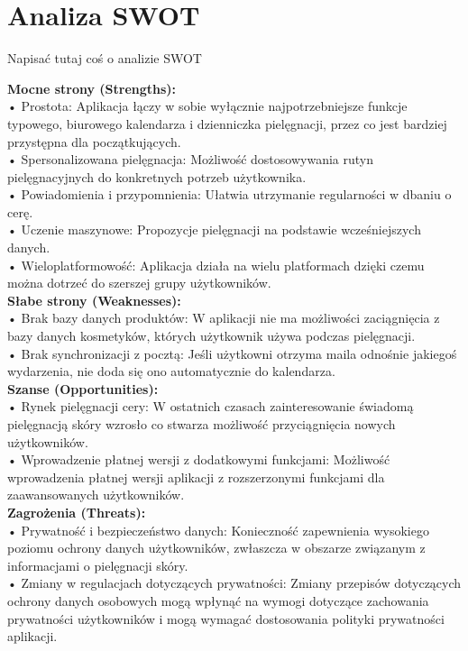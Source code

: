 \section{Analiza SWOT}
Napisać tutaj coś o analizie SWOT

\phantom{Th} 

\textbf{Mocne strony (Strengths):}\\
•	Prostota: Aplikacja łączy w sobie wyłącznie najpotrzebniejsze funkcje typowego, biurowego kalendarza i dzienniczka pielęgnacji, przez co jest bardziej przystępna dla początkujących.\\
•	Spersonalizowana pielęgnacja: Możliwość dostosowywania rutyn pielęgnacyjnych do konkretnych potrzeb użytkownika.\\
•	Powiadomienia i przypomnienia: Ułatwia utrzymanie regularności w dbaniu o cerę.\\
•	Uczenie maszynowe: Propozycje pielęgnacji na podstawie wcześniejszych danych.\\
•	Wieloplatformowość: Aplikacja działa na wielu platformach dzięki czemu można dotrzeć do szerszej grupy użytkowników.\\

\textbf{Słabe strony (Weaknesses):}\\
•	Brak bazy danych produktów: W aplikacji nie ma możliwości zaciągnięcia z bazy danych kosmetyków, których użytkownik używa podczas pielęgnacji.\\
•	Brak synchronizacji z pocztą: Jeśli użytkowni otrzyma maila odnośnie jakiegoś wydarzenia, nie doda się ono automatycznie do kalendarza.\\

\textbf{Szanse (Opportunities):}\\
•	Rynek pielęgnacji cery: W ostatnich czasach zainteresowanie świadomą pielęgnacją skóry wzrosło co stwarza możliwość przyciągnięcia nowych użytkowników.\\
•	Wprowadzenie płatnej wersji z dodatkowymi funkcjami: Możliwość wprowadzenia płatnej wersji aplikacji z rozszerzonymi funkcjami dla zaawansowanych użytkowników.\\

\textbf{Zagrożenia (Threats):}\\
•	Prywatność i bezpieczeństwo danych: Konieczność zapewnienia wysokiego poziomu ochrony danych użytkowników, zwłaszcza w obszarze związanym z informacjami o pielęgnacji skóry.\\
•	Zmiany w regulacjach dotyczących prywatności: Zmiany przepisów dotyczących ochrony danych osobowych mogą wpłynąć na wymogi dotyczące zachowania prywatności użytkowników i mogą wymagać dostosowania polityki prywatności aplikacji.\\
